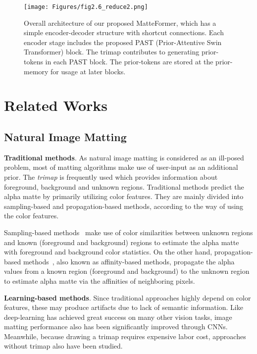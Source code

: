 \documentclass[10pt,twocolumn,letterpaper]{article}
\begin{document}
\begin{figure*}
  \begin{center}
  \texttt{[image: Figures/fig2.6\_reduce2.png]}
  \end{center}
  \vspace{-5mm}
  \caption{Overall architecture of our proposed MatteFormer, which has a simple encoder-decoder structure with shortcut connections. Each encoder stage includes the proposed PAST (Prior-Attentive Swin Transformer) block. The trimap contributes to generating prior-tokens in each PAST block. The prior-tokens are stored at the prior-memory for usage at later blocks.}
  \label{fig:MatteFormer}
\end{figure*}

\section{Related Works }
\label{sec:related works}

\subsection{Natural Image Matting}

\textbf{Traditional methods}.
As natural image matting is considered as an ill-posed problem, most of matting algorithms make use of user-input as an additional prior. The \textit{trimap} is frequently used which provides information about foreground, background and unknown regions.
Traditional methods predict the alpha matte by primarily utilizing color features. They are mainly divided into sampling-based and propagation-based methods, according to the way of using the color features.

Sampling-based methods~\cite{gastal2010shared, chuang2001bayesian, he2011global, shahrian2013improving, wang2007optimized} make use of color similarities between unknown regions and known (foreground and background) regions to estimate the alpha matte with foreground and background color statistics.
On the other hand, propagation-based methods~\cite{chen2013knn, lee2011nonlocal, levin2007closed, levin2008spectral, he2010fast, sun2004poisson}, also known as affinity-based methods, propagate the alpha values from a known region (foreground and background) to the unknown region to estimate alpha matte via the affinities of neighboring pixels.

\textbf{Learning-based methods}. 
Since traditional approaches highly depend on color features, these may produce artifacts due to lack of semantic information. Like deep-learning has achieved great success on many other vision tasks, image matting performance also has been significantly improved through CNNs. Meanwhile, because drawing a trimap requires expensive labor cost, approaches without trimap also have been studied.
\end{document}

